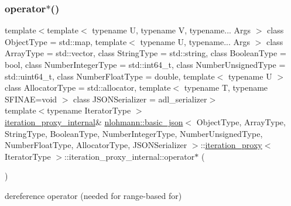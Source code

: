 \mbox{\label{classnlohmann_1_1basic__json_1_1iteration__proxy_1_1iteration__proxy__internal_a6c3fea9291d981433c6be1691242be4b}} 
\subsubsection{\texorpdfstring{operator$\ast$()}{operator*()}}
{\footnotesize\ttfamily template$<$template$<$ typename U, typename V, typename... Args $>$ class Object\+Type = std\+::map, template$<$ typename U, typename... Args $>$ class Array\+Type = std\+::vector, class String\+Type  = std\+::string, class Boolean\+Type  = bool, class Number\+Integer\+Type  = std\+::int64\+\_\+t, class Number\+Unsigned\+Type  = std\+::uint64\+\_\+t, class Number\+Float\+Type  = double, template$<$ typename U $>$ class Allocator\+Type = std\+::allocator, template$<$ typename T, typename S\+F\+I\+N\+A\+E=void $>$ class J\+S\+O\+N\+Serializer = adl\+\_\+serializer$>$ \\
template$<$typename Iterator\+Type $>$ \\
\hyperlink{classnlohmann_1_1basic__json_1_1iteration__proxy_1_1iteration__proxy__internal}{iteration\+\_\+proxy\+\_\+internal}\& \hyperlink{classnlohmann_1_1basic__json}{nlohmann\+::basic\+\_\+json}$<$ Object\+Type, Array\+Type, String\+Type, Boolean\+Type, Number\+Integer\+Type, Number\+Unsigned\+Type, Number\+Float\+Type, Allocator\+Type, J\+S\+O\+N\+Serializer $>$\+::\hyperlink{classnlohmann_1_1basic__json_1_1iteration__proxy}{iteration\+\_\+proxy}$<$ Iterator\+Type $>$\+::iteration\+\_\+proxy\+\_\+internal\+::operator$\ast$ (\begin{DoxyParamCaption}{ }\end{DoxyParamCaption})\hspace{0.3cm}{\ttfamily [inline]}}



dereference operator (needed for range-\/based for) 

\mbox{\label{classnlohmann_1_1basic__json_1_1iteration__proxy_1_1iteration__proxy__internal_a54aa384e30ee304e347d3b046f1dc6f8}} 
